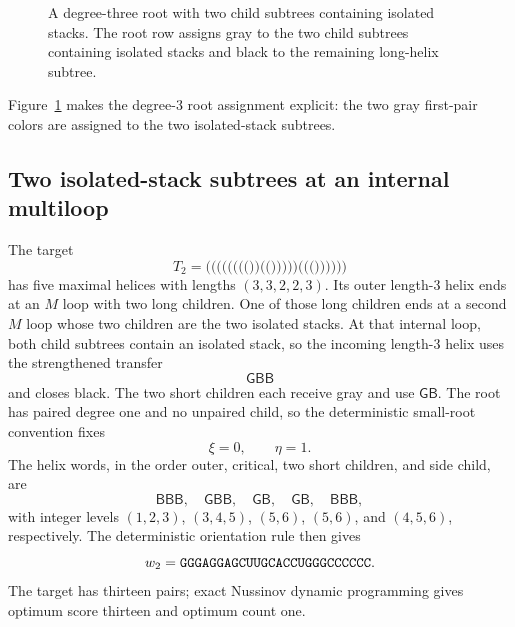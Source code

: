 \documentclass[11pt]{article}
\newcommand{\Bcol}{\mathsf{B}}
\newcommand{\Gray}{\mathsf{G}}
\begin{document}
\begin{figure}[t]
\centering
{}
\caption{A degree-three root with two child subtrees containing isolated stacks.  The root row assigns gray to the two child subtrees containing isolated stacks and black to the remaining long-helix subtree.}
\label{fig:root-example}
\end{figure}

Figure~\ref{fig:root-example} makes the degree-3 root assignment explicit: the two gray first-pair colors are assigned to the two isolated-stack subtrees.

\subsection{Two isolated-stack subtrees at an internal multiloop}

The target
\[
T_2=\texttt{(((((((())(()))))((())))))}
\]
has five maximal helices with lengths $(3,3,2,2,3)$.  Its outer length-3 helix ends at an $M$ loop with two long children.  One of those long children ends at a second $M$ loop whose two children are the two isolated stacks.  At that internal loop, both child subtrees contain an isolated stack, so the incoming length-3 helix uses the strengthened transfer
\[
\Gray\Bcol\Bcol
\]
and closes black.  The two short children each receive gray and use $\Gray\Bcol$.  The root has paired degree one and no unpaired child, so the deterministic small-root convention fixes
\[
\xi=0,\qquad \eta=1.
\]
The helix words, in the order outer, critical, two short children, and side child, are
\[
\Bcol\Bcol\Bcol,\quad
\Gray\Bcol\Bcol,\quad
\Gray\Bcol,\quad
\Gray\Bcol,\quad
\Bcol\Bcol\Bcol,
\]
with integer levels $(1,2,3)$, $(3,4,5)$, $(5,6)$, $(5,6)$, and $(4,5,6)$, respectively.  The deterministic orientation rule then gives
\[
w_2=\texttt{GGGAGGAGCUUGCACCUGGGCCCCCC}.
\]
The target has thirteen pairs; exact Nussinov dynamic programming gives optimum score thirteen and optimum count one.
\end{document}
